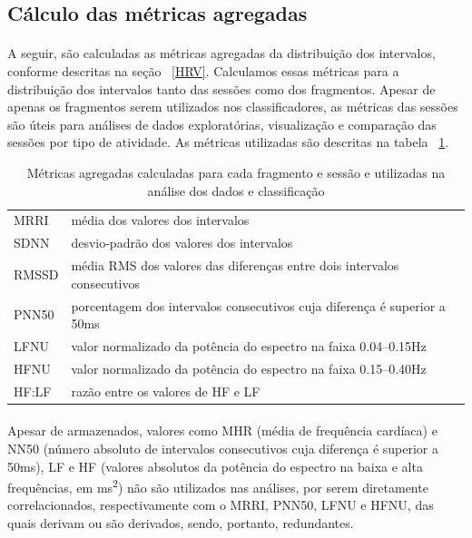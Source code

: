         \subsection{Cálculo das métricas agregadas}
        
            \paragraph{}A seguir, são calculadas as métricas agregadas da distribuição dos intervalos, conforme descritas na seção ~\ref{HRV}. Calculamos essas métricas para a distribuição dos intervalos tanto das sessões como dos fragmentos. Apesar de apenas os fragmentos serem utilizados nos classificadores, as métricas das sessões são úteis para análises de dados exploratórias, visualização e comparação das sessões por tipo de atividade. As métricas utilizadas são descritas na tabela ~\ref{feats}.
  
            \begin{table}[h!]
                \centering
                \begin{tabular}{ll}
                MRRI  & média dos valores dos intervalos                             \\
                SDNN  & desvio-padrão dos valores dos intervalos                     \\
                RMSSD & média RMS dos valores das diferenças entre dois intervalos consecutivos \\
                PNN50 & porcentagem dos intervalos consecutivos cuja diferença é superior a 50ms \\
                LFNU  & valor normalizado da potência do espectro na faixa 0.04–0.15Hz\\
                HFNU  & valor normalizado da potência do espectro na faixa 0.15–0.40Hz\\
                HF:LF & razão entre os valores de HF e LF
                \end{tabular}
                \caption{Métricas agregadas calculadas para cada fragmento e sessão e utilizadas na análise dos dados e classificação}
                \label{feats}
            \end{table}
            
            \paragraph{}Apesar de armazenados, valores como MHR (média de frequência cardíaca) e NN50 (número absoluto de intervalos consecutivos cuja diferença é superior a 50ms), LF e HF (valores absolutos da potência do espectro na baixa e alta frequências, em ms\textsuperscript{2}) não são utilizados nas análises, por serem diretamente correlacionados, respectivamente com o MRRI, PNN50, LFNU e HFNU, das quais derivam ou são derivados, sendo, portanto, redundantes. 
            
